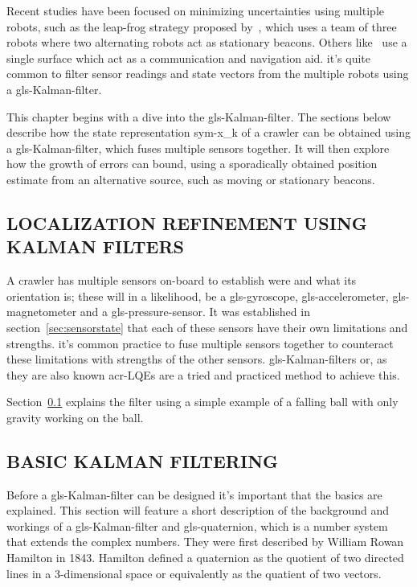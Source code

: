 Recent studies have been focused on minimizing uncertainties using multiple robots, such as the leap-frog strategy
proposed by~\citet{tully_leap_frog_2010}, which uses a team of three robots where two alternating robots act as
stationary beacons. Others like~\citet{wei_gao_robust_2014} use a single surface which act as a communication and
navigation aid. it's quite common to filter sensor readings and state vectors from the multiple robots using a
\gls{gls-Kalman-filter}.

This chapter begins with a dive into the \gls{gls-Kalman-filter}. The sections below describe how the state
representation \gls{sym-x_k} of a crawler can be obtained using a \gls{gls-Kalman-filter}, which fuses multiple sensors
together. It will then explore how the growth of errors can bound, using a sporadically obtained position estimate from
an alternative source, such as moving or stationary beacons.

\subsection{LOCALIZATION REFINEMENT USING KALMAN FILTERS}\label{sec:KalmanRefinement}

A crawler has multiple sensors on-board to establish were and what its orientation is; these will in a likelihood, be
a \gls{gls-gyroscope}, \gls{gls-accelerometer}, \gls{gls-magnetometer} and a \gls{gls-pressure-sensor}. It was 
established in section~\ref{sec:sensorstate} that each of these sensors have their own limitations and strengths. 
it's common practice to fuse multiple sensors together to counteract these limitations with strengths of the other 
sensors. \glspl{gls-Kalman-filter} or, as they are also known \glspl{acr-LQE} are a tried and practiced method to 
achieve this.

Section~\ref{sec:KalmanRefinement} explains the filter using a simple example of a falling ball with only gravity
working on the ball.

\subsection{BASIC KALMAN FILTERING}\label{sec:basic Kalman filter}

Before a \gls{gls-Kalman-filter} can be designed it's important that the basics are explained. This section will 
feature a short description of the background and workings of a \gls{gls-Kalman-filter}  and \gls{gls-quaternion}, 
which is a number system that extends the complex numbers. They were first described by William Rowan Hamilton in 
1843. Hamilton defined a quaternion as the quotient of two directed lines in a 3-dimensional space or equivalently as
the quatient of two vectors.

